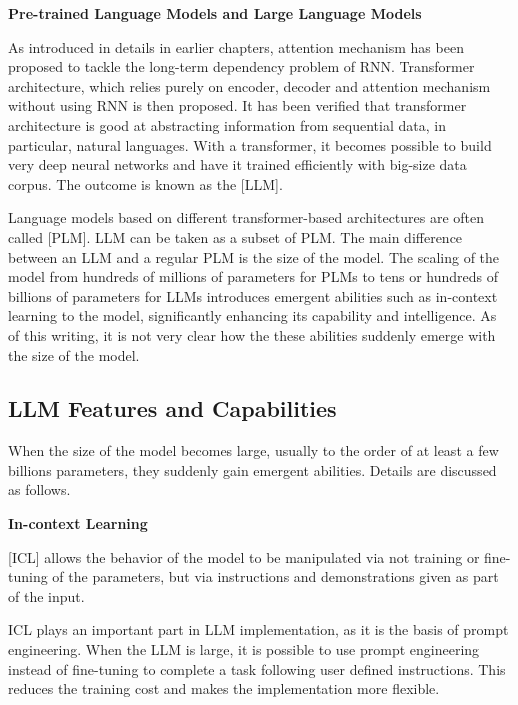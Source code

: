 \vspace{0.1in}
\noindent \textbf{Pre-trained Language Models and Large Language Models}
\vspace{0.1in}

As introduced in details in earlier chapters, attention mechanism has been proposed to tackle the long-term dependency problem of RNN. Transformer architecture, which relies purely on encoder, decoder and attention mechanism without using RNN is then proposed. It has been verified that transformer architecture is good at abstracting information from sequential data, in particular, natural languages. With a transformer, it becomes possible to build very deep neural networks and have it trained efficiently with big-size data corpus. The outcome is known as the [LLM].

Language models based on different transformer-based architectures are often called [PLM]. LLM can be taken as a subset of PLM. The main difference between an LLM and a regular PLM is the size of the model. The scaling of the model from hundreds of millions of parameters for PLMs to tens or hundreds of billions of parameters for LLMs introduces emergent abilities such as in-context learning to the model, significantly enhancing its capability and intelligence. As of this writing, it is not very clear how the these abilities suddenly emerge with the size of the model.

\subsection{LLM Features and Capabilities}

When the size of the model becomes large, usually to the order of at least a few billions parameters, they suddenly gain emergent abilities. Details are discussed as follows.

\vspace{0.1in}
\noindent \textbf{In-context Learning}
\vspace{0.1in}

[ICL] allows the behavior of the model to be manipulated via not training or fine-tuning of the parameters, but via instructions and demonstrations given as part of the input.

ICL plays an important part in LLM implementation, as it is the basis of prompt engineering. When the LLM is large, it is possible to use prompt engineering instead of fine-tuning to complete a task following user defined instructions. This reduces the training cost and makes the implementation more flexible.


